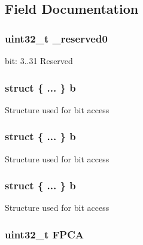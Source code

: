 \subsection{Field Documentation}
\hypertarget{union_c_o_n_t_r_o_l___type_ac8a6a13838a897c8d0b8bc991bbaf7c1}{
\subsubsection[{\-\_\-reserved0}]{\setlength{\rightskip}{0pt plus 5cm}uint32\-\_\-t \-\_\-reserved0}}\label{union_c_o_n_t_r_o_l___type_ac8a6a13838a897c8d0b8bc991bbaf7c1}
bit\-: 3..31 Reserved \hypertarget{union_c_o_n_t_r_o_l___type_ab2a41711c248a319c2e7d0ab73c3a8b9}{
\subsubsection[{b}]{\setlength{\rightskip}{0pt plus 5cm}struct \{ ... \}   b}}\label{union_c_o_n_t_r_o_l___type_ab2a41711c248a319c2e7d0ab73c3a8b9}
Structure used for bit access \hypertarget{union_c_o_n_t_r_o_l___type_a362f58ce033c684dddd5ae69c5417ef5}{
\subsubsection[{b}]{\setlength{\rightskip}{0pt plus 5cm}struct \{ ... \}   b}}\label{union_c_o_n_t_r_o_l___type_a362f58ce033c684dddd5ae69c5417ef5}
Structure used for bit access \hypertarget{union_c_o_n_t_r_o_l___type_ae03cf62a84c9224544bebc7eed2d730d}{
\subsubsection[{b}]{\setlength{\rightskip}{0pt plus 5cm}struct \{ ... \}   b}}\label{union_c_o_n_t_r_o_l___type_ae03cf62a84c9224544bebc7eed2d730d}
Structure used for bit access \hypertarget{union_c_o_n_t_r_o_l___type_a2518558c090f60161ba4e718a54ee468}{
\subsubsection[{F\-P\-C\-A}]{\setlength{\rightskip}{0pt plus 5cm}uint32\-\_\-t F\-P\-C\-A}}\label{union_c_o_n_t_r_o_l___type_a2518558c090f60161ba4e718a54ee468}
